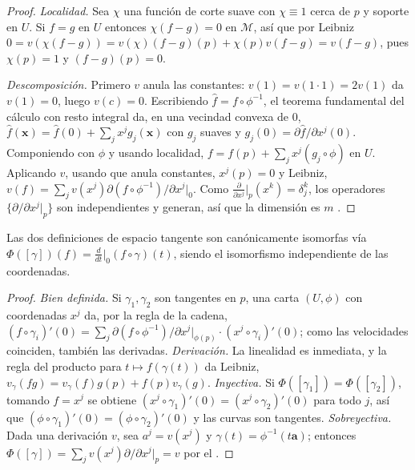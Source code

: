 \begin{proof}
\emph{Localidad.} Sea $\chi$ una funci\'on de corte suave con $\chi \equiv 1$ cerca
de $p$ y soporte en $U$. Si $f = g$ en $U$ entonces $\chi(f-g) = 0$ en
$\mathcal{M}$, as\'i que por Leibniz $0 = v(\chi(f-g)) = v(\chi)(f-g)(p) +
\chi(p)v(f-g) = v(f-g)$, pues $\chi(p) = 1$ y $(f-g)(p) = 0$.

\emph{Descomposici\'on.} Primero $v$ anula las constantes: $v(1) = v(1\cdot 1) =
2v(1)$ da $v(1) = 0$, luego $v(c) = 0$. Escribiendo $\hat f = f\circ\phi^{-1}$, el
teorema fundamental del c\'alculo con resto integral da, en una vecindad convexa de
$0$, $\hat f(\mathbf{x}) = \hat f(0) + \sum_j x^j g_j(\mathbf{x})$ con $g_j$ suaves
y $g_j(0) = \partial\hat f/\partial x^j(0)$. Componiendo con $\phi$ y usando
localidad, $f = f(p) + \sum_j x^j (g_j\circ\phi)$ en $U$. Aplicando $v$, usando que
anula constantes, $x^j(p) = 0$ y Leibniz, $v(f) = \sum_j v(x^j)
\partial(f\circ\phi^{-1})/\partial x^j|_0$. Como $\frac{\partial}{\partial
x^j}|_p(x^k) = \delta_j^k$, los operadores $\{\partial/\partial x^j|_p\}$ son
independientes y generan, as\'i que la dimensi\'on es $m$
\citep[Prop.~3.2]{lee2012introduction}.
\end{proof}

\begin{proposition}
\label{prop:found:tangent-equiv}
Las dos definiciones de espacio tangente son can\'onicamente isomorfas v\'ia
$\Phi([\gamma])(f) = \frac{d}{dt}\big|_0 (f\circ\gamma)(t)$, siendo el isomorfismo
independiente de las coordenadas.
\end{proposition}

\begin{proof}
\emph{Bien definida.} Si $\gamma_1, \gamma_2$ son tangentes en $p$, una carta
$(U,\phi)$ con coordenadas $x^j$ da, por la regla de la cadena, $(f\circ\gamma_i)'(0)
= \sum_j \partial(f\circ\phi^{-1})/\partial x^j|_{\phi(p)} \cdot
(x^j\circ\gamma_i)'(0)$; como las velocidades coinciden, tambi\'en las derivadas.
\emph{Derivaci\'on.} La linealidad es inmediata, y la regla del producto para
$t \mapsto f(\gamma(t))$ da Leibniz, $v_\gamma(fg) = v_\gamma(f)g(p) +
f(p)v_\gamma(g)$. \emph{Inyectiva.} Si $\Phi([\gamma_1]) = \Phi([\gamma_2])$,
tomando $f = x^j$ se obtiene $(x^j\circ\gamma_1)'(0) = (x^j\circ\gamma_2)'(0)$ para
todo $j$, as\'i que $(\phi\circ\gamma_1)'(0) = (\phi\circ\gamma_2)'(0)$ y las curvas
son tangentes. \emph{Sobreyectiva.} Dada una derivaci\'on $v$, sea $a^j = v(x^j)$ y
$\gamma(t) = \phi^{-1}(t\mathbf{a})$; entonces $\Phi([\gamma]) = \sum_j v(x^j)
\partial/\partial x^j|_p = v$ por el .
\end{proof}

